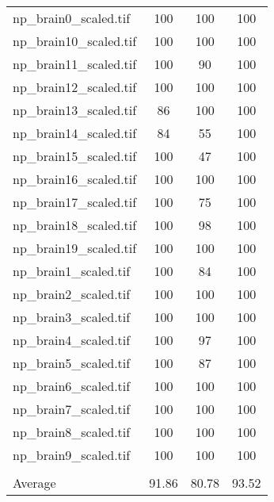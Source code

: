 \begin{tabular}{lccc}
 np\_brain0\_scaled.tif                     & 100   & 100   & 100   \\
 np\_brain10\_scaled.tif                    & 100   & 100   & 100   \\
 np\_brain11\_scaled.tif                    & 100   & 90    & 100   \\
 np\_brain12\_scaled.tif                    & 100   & 100   & 100   \\
 np\_brain13\_scaled.tif                    & 86    & 100   & 100   \\
 np\_brain14\_scaled.tif                    & 84    & 55    & 100   \\
 np\_brain15\_scaled.tif                    & 100   & 47    & 100   \\
 np\_brain16\_scaled.tif                    & 100   & 100   & 100   \\
 np\_brain17\_scaled.tif                    & 100   & 75    & 100   \\
 np\_brain18\_scaled.tif                    & 100   & 98    & 100   \\
 np\_brain19\_scaled.tif                    & 100   & 100   & 100   \\
 np\_brain1\_scaled.tif                     & 100   & 84    & 100   \\
 np\_brain2\_scaled.tif                     & 100   & 100   & 100   \\
 np\_brain3\_scaled.tif                     & 100   & 100   & 100   \\
 np\_brain4\_scaled.tif                     & 100   & 97    & 100   \\
 np\_brain5\_scaled.tif                     & 100   & 87    & 100   \\
 np\_brain6\_scaled.tif                     & 100   & 100   & 100   \\
 np\_brain7\_scaled.tif                     & 100   & 100   & 100   \\
 np\_brain8\_scaled.tif                     & 100   & 100   & 100   \\
 np\_brain9\_scaled.tif                     & 100   & 100   & 100   \\
                                          &       &       &       \\
 Average                                  & 91.86 & 80.78 & 93.52 \\
\hline
\end{tabular}